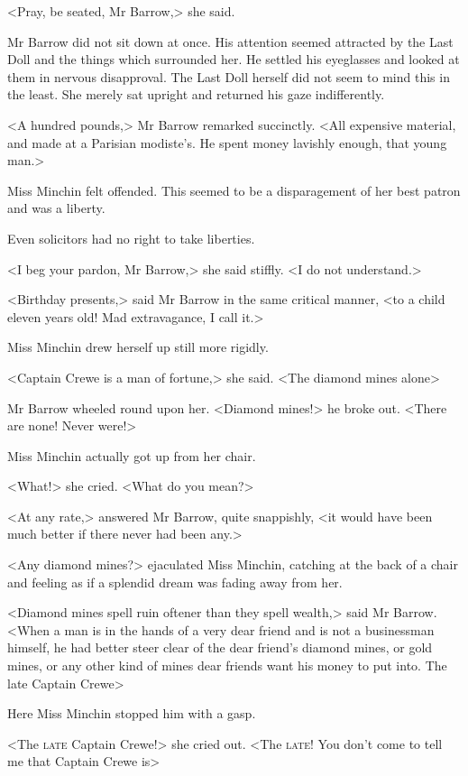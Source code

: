 <Pray, be seated, Mr Barrow,> she said.

Mr Barrow did not sit down at once. His attention seemed attracted by the Last Doll and the things which surrounded her. He settled his eyeglasses and looked at them in nervous disapproval. The Last Doll herself did not seem to mind this in the least. She merely sat upright and returned his gaze indifferently.

<A hundred pounds,> Mr Barrow remarked succinctly. <All expensive material, and made at a Parisian modiste's. He spent money lavishly enough, that young man.>

Miss Minchin felt offended. This seemed to be a disparagement of her best patron and was a liberty.

Even solicitors had no right to take liberties.

<I beg your pardon, Mr Barrow,> she said stiffly. <I do not understand.>

<Birthday presents,> said Mr Barrow in the same critical manner, <to a child eleven years old! Mad extravagance, I call it.>

Miss Minchin drew herself up still more rigidly.

<Captain Crewe is a man of fortune,> she said. <The diamond mines alone\longdash>

Mr Barrow wheeled round upon her. <Diamond mines!> he broke out. <There are none! Never were!>

Miss Minchin actually got up from her chair.

<What!> she cried. <What do you mean?>

<At any rate,> answered Mr Barrow, quite snappishly, <it would have been much better if there never had been any.>

<Any diamond mines?> ejaculated Miss Minchin, catching at the back of a chair and feeling as if a splendid dream was fading away from her.

<Diamond mines spell ruin oftener than they spell wealth,> said Mr Barrow. <When a man is in the hands of a very dear friend and is not a businessman himself, he had better steer clear of the dear friend's diamond mines, or gold mines, or any other kind of mines dear friends want his money to put into. The late Captain Crewe\longdash>

Here Miss Minchin stopped him with a gasp.

<The \textsc{late} Captain Crewe!> she cried out. <The \textsc{late}! You don't come to tell me that Captain Crewe is\longdash>

